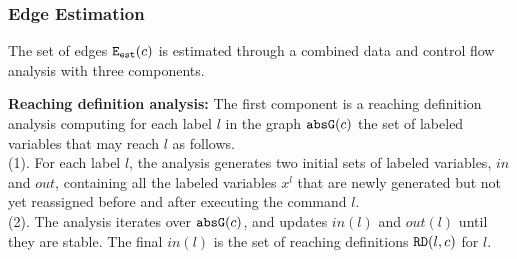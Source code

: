 \subsubsection{Edge Estimation}
\label{sec:alg_edgegen}
The set of edges $\mathtt{{E_{est}}}(c)$ is estimated through a combined data and control flow analysis with three components.

\noindent\textbf{Reaching definition analysis:} 
{The first component is a reaching definition analysis computing for each label $l$ in the graph $\mathtt{abs}{\mathtt{G}}(c)$ the set of labeled variables that may reach $l$ as follows.}
\\
{
(1). 
For each label $l$, the analysis generates two initial sets of labeled variables, $in$ and $out$, 
containing all the labeled variables $x^l$ that are newly generated but not yet reassigned before and after executing the command $l$.
\\
(2). The analysis iterates over $\mathtt{abs}{\mathtt{G}}(c)$, and updates $in(l)$ and $out(l)$ until they  are stable.
The final $in(l)$ is the set of reaching definitions $\mathtt{RD}(l, c)$ for $l$.}
    
